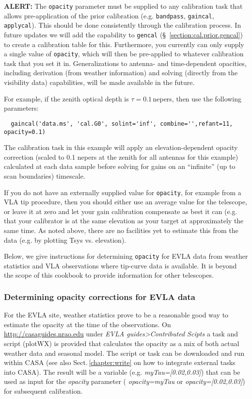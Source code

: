 {\bf ALERT:} The {\tt opacity} parameter must be supplied
to any calibration task that allows pre-application of the prior
calibration (e.g. {\tt bandpass}, {\tt gaincal}, {\tt applycal}).
This should be done consistently through the calibration process.
In future updates we will add the capability to {\tt gencal}
(\S~\ref{section:cal.prior.gencal}) to create a calibration table for this.
Furthermore, you currently can only supply a single value
of {\tt opacity}, which will then be pre-applied to whatever 
calibration task that you set it in.
Generalizations to antenna- and time-dependent opacities, including
derivation (from weather information) and solving (directly from the
visibility data) capabilities, will be made available in the future.

For example, if the zenith optical depth is $\tau=0.1$\,nepers, then
use the following parameters:
\small
\begin{verbatim}
  gaincal('data.ms', 'cal.G0', solint='inf', combine='',refant=11, opacity=0.1)
\end{verbatim}
\normalsize
The calibration task in this example will apply an
elevation-dependent opacity correction (scaled to 0.1 nepers at the
zenith for all antennas for this example) calculated at each 
data sample before solving for gains on an ``infinite'' (up to scan
boundaries) timescale. 

If you do not have an externally supplied value for {\tt opacity}, for
example from a VLA tip procedure, then you should either use an
average value for the telescope, or leave it at zero and let
your gain calibration compensate as best it can (e.g. that your 
calibrator is at the same elevation as your target at approximately 
the same time.
As noted above, there are no facilities yet to estimate this from the
data (e.g. by plotting Tsys vs. elevation).

Below, we give instructions for determining {\tt opacity} for EVLA
data from weather statistics and VLA observations where tip-curve data
is available.  It is beyond the scope of this cookbook to provide
information for other telescopes.

\subsubsection{Determining opacity corrections for EVLA data}
\label{section:cal.prior.opacity.evla}

For the EVLA site, weather statistics prove to be a reasonable good
way to estimate the opacity at the time of the observations. On
\url{http://casaguides.nrao.edu} under {\it EVLA guides>Contributed
  Scipts} a task and script (plotWX) is provided that calculates the
opacity as a mix of both actual weather data and seasonal model. The
script or task can be downloaded and run within CASA (see also
Sect.\,\ref{chapter:write} on how to integrate external tasks into
CASA). The result will be a variable (e.g. {\it myTau=[0.02,0.03]})
that can be used as input for the {\it opacity} parameter ({\it
  opacity=myTau} or {\it opacity=[0.02,0.03]}) for subsequent
  calibration.


